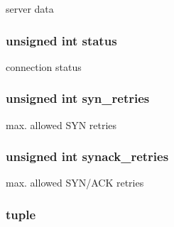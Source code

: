 server data 

\hypertarget{struct__tcp__stream___aeed08ea57af6f7be240e2bf66162389f}{
\subsubsection[{status}]{\setlength{\rightskip}{0pt plus 5cm}unsigned int status}}\label{struct__tcp__stream___aeed08ea57af6f7be240e2bf66162389f}


connection status 

\hypertarget{struct__tcp__stream___ac9513bdb8bd827b1cb22798ae852ba13}{
\subsubsection[{syn\-\_\-retries}]{\setlength{\rightskip}{0pt plus 5cm}unsigned int syn\-\_\-retries}}\label{struct__tcp__stream___ac9513bdb8bd827b1cb22798ae852ba13}


max. allowed S\-Y\-N retries 

\hypertarget{struct__tcp__stream___ab971226b37668b378effb81aeba6a63c}{
\subsubsection[{synack\-\_\-retries}]{\setlength{\rightskip}{0pt plus 5cm}unsigned int synack\-\_\-retries}}\label{struct__tcp__stream___ab971226b37668b378effb81aeba6a63c}


max. allowed S\-Y\-N/\-A\-C\-K retries 

\hypertarget{struct__tcp__stream___ace3ecfe5f3174bb45bbead89efe846de}{
\subsubsection[{tuple}]{ tuple}}\label{struct__tcp__stream___ace3ecfe5f3174bb45bbead89efe846de}


